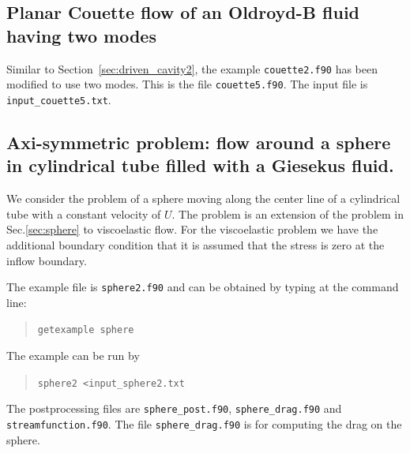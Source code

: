 \subsection{Planar Couette flow of an Oldroyd-B fluid having two modes}
\label{sec:couette2}

Similar to Section~\ref{sec:driven_cavity2}, the example \texttt{couette2.f90}
has been modified to use two modes. This is the file \texttt{couette5.f90}. The
input file is \texttt{input\_couette5.txt}.

\subsection{Axi-symmetric problem: flow around a sphere in
 cylindrical tube filled with a Giesekus fluid.}
\label{sec:sphere2}

We consider the problem of a sphere moving along
the center line of a cylindrical tube with a constant velocity of $U$.
The problem is an extension of the problem in Sec.\ref{sec:sphere} to
viscoelastic flow. For the viscoelastic problem we have the additional boundary
condition that it is assumed that the stress is zero at the inflow boundary.

The example file is \texttt{sphere2.f90} and can be obtained by typing at the
command line:
\begin{quote}
   \texttt{getexample sphere}
\end{quote}
The example can be run by
\begin{quote}
   \texttt{sphere2 <input\_sphere2.txt}
\end{quote}
The postprocessing files are \texttt{sphere\_post.f90}, 
\texttt{sphere\_drag.f90} and \texttt{streamfunction.f90}. The file
\texttt{sphere\_drag.f90} is for computing the drag on the sphere.

